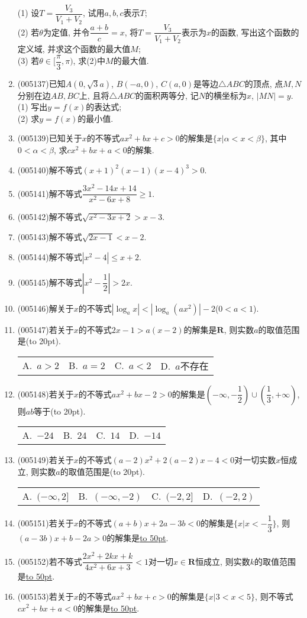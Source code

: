 \documentclass[10pt,a4paper]{article}
\newcommand{\blank}[1]{\underline{\hbox to #1pt{}}}
\newcommand{\bracket}[1]{(\hbox to #1pt{})}
\newcommand{\fourch}[4]{\par\begin{tabular}{p{.23\textwidth}p{.23\textwidth}p{.23\textwidth}p{.23\textwidth}}
A.~#1 &B.~#2& C.~#3& D.~#4
\end{tabular}}
\begin{document}
\begin{enumerate}[1.]
(1) 设$T=\dfrac{V_3}{V_1+V_2}$, 试用$a,b,c$表示$T$;\\
(2) 若$\theta$为定值, 并令$\dfrac{a+b}c=x$, 将$T=\dfrac{V_3}{V_1+V_2}$表示为$x$的函数, 写出这个函数的定义域, 并求这个函数的最大值$M$;\\
(3) 若$\theta \in [\dfrac{\pi }3,\pi)$, 求(2)中$M$的最大值.
\item {\tiny (005137)}已知$A(0,\sqrt 3a)$, $B(-a,0)$, $C(a,0)$是等边$\triangle ABC$的顶点, 点$M,N$分别在边$AB,BC$上, 且将$\triangle ABC$的面积两等分, 记$N$的横坐标为$x$, $|MN|=y$.\\
(1) 写出$y=f(x)$的表达式;\\
(2) 求$y=f(x)$的最小值.
\item {\tiny (005139)}已知关于$x$的不等式$ax^2+bx+c>0$的解集是$\{x|\alpha<x<\beta\}$, 其中$0<\alpha<\beta$, 求$cx^2+bx+a<0$的解集.
\item {\tiny (005140)}解不等式$(x+1)^2(x-1)(x-4)^3>0$.
\item {\tiny (005141)}解不等式$\dfrac{3x^2-14x+14}{x^2-6x+8}\ge 1$.
\item {\tiny (005142)}解不等式$\sqrt{x^2-3x+2}>x-3$.
\item {\tiny (005143)}解不等式$\sqrt{2x-1}<x-2$.
\item {\tiny (005144)}解不等式$|x^2-4|\le x+2$.
\item {\tiny (005145)}解不等式$|x^2-\dfrac 12|>2x$.
\item {\tiny (005146)}解关于$x$的不等式$|\log_ax|<|\log_a(ax^2)|-2$($0<a<1$).
\item {\tiny (005147)}若关于$x$的不等式$2x-1>a(x-2)$的解集是$\mathbf{R}$, 则实数$a$的取值范围是\bracket{20}.
\fourch{$a>2$}{$a=2$}{$a<2$}{$a$不存在}
\item {\tiny (005148)}若关于$x$的不等式$ax^2+bx-2>0$的解集是$(-\infty ,-\dfrac 12)\cup (\dfrac 13,+\infty)$, 则$ab$等于\bracket{20}.
\fourch{$-24$}{$24$}{$14$}{$-14$}
\item {\tiny (005149)}若关于$x$的不等式$(a-2)x^2+2(a-2)x-4<0$对一切实数$x$恒成立, 则实数$a$的取值范围是\bracket{20}.
\fourch{$(-\infty ,2]$}{$(-\infty,-2)$}{$(-2,2]$}{$(-2,2)$}
\item {\tiny (005151)}若关于$x$的不等式$(a+b)x+2a-3b<0$的解集是$\{x|x<-\dfrac 13\}$, 则$(a-3b)x+b-2a>0$的解集是\blank{50}.
\item {\tiny (005152)}若不等式$\dfrac{2x^2+2kx+k}{4x^2+6x+3}<1$对一切$x\in \mathbf{R}$恒成立, 则实数$k$的取值范围是\blank{50}.
\item {\tiny (005153)}若关于$x$的不等式$ax^2+bx+c>0$的解集是$\{x|3<x<5\}$, 则不等式$cx^2+bx+a<0$的解集是\blank{50}.

\end{enumerate}
\end{document}
